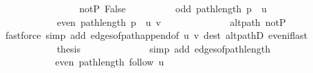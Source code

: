 \begin{isabellebody}
\ \ \ \ \ \ \isamarkupfalse%
\isanewline
\ \ \ \ \ \ \ \ \isamarkupfalse%
\ not{\isacharunderscore}{\kern0pt}P{\isacharprime}{\kern0pt}{\isacharprime}{\kern0pt}{\isacharcolon}{\kern0pt}\ False\isanewline
\ \ \ \ \ \ \ \ \isamarkupfalse%
\ {\isachardoublequoteopen}odd\ {\isacharparenleft}{\kern0pt}path{\isacharunderscore}{\kern0pt}length\ {\isacharparenleft}{\kern0pt}p\ {\isacharat}{\kern0pt}\ {\isacharbrackleft}{\kern0pt}u{\isacharbrackright}{\kern0pt}{\isacharparenright}{\kern0pt}{\isacharparenright}{\kern0pt}{\isachardoublequoteclose}\isanewline
\ \ \ \ \ \ \ \ \isamarkupfalse%
\ {\isacharminus}{\kern0pt}\isanewline
\ \ \ \ \ \ \ \ \ \ \isamarkupfalse%
\ {\isachardoublequoteopen}even\ {\isacharparenleft}{\kern0pt}path{\isacharunderscore}{\kern0pt}length\ {\isacharparenleft}{\kern0pt}p\ {\isacharat}{\kern0pt}\ {\isacharbrackleft}{\kern0pt}u{\isacharcomma}{\kern0pt}\ v{\isacharbrackright}{\kern0pt}{\isacharparenright}{\kern0pt}{\isacharparenright}{\kern0pt}{\isachardoublequoteclose}\isanewline
\ \ \ \ \ \ \ \ \ \ \ \ \isamarkupfalse%
\ alt{\isacharunderscore}{\kern0pt}path\ not{\isacharunderscore}{\kern0pt}P{\isacharprime}{\kern0pt}{\isacharprime}{\kern0pt}\isanewline
\ \ \ \ \ \ \ \ \ \ \ \ \isamarkupfalse%
\ {\isacharparenleft}{\kern0pt}fastforce\ simp\ add{\isacharcolon}{\kern0pt}\ edges{\isacharunderscore}{\kern0pt}of{\isacharunderscore}{\kern0pt}path{\isacharunderscore}{\kern0pt}append{\isacharunderscore}{\kern0pt}{}{\isacharbrackleft}{\kern0pt}of\ {\isachardoublequoteopen}{\isacharbrackleft}{\kern0pt}u{\isacharcomma}{\kern0pt}\ v{\isacharbrackright}{\kern0pt}{\isachardoublequoteclose}{\isacharbrackright}{\kern0pt}\ dest{\isacharcolon}{\kern0pt}\ alt{\isacharunderscore}{\kern0pt}pathD{\isacharparenleft}{\kern0pt}{}{\isacharparenright}{\kern0pt}\ even{\isacharunderscore}{\kern0pt}if{\isacharunderscore}{\kern0pt}last{\isacharparenright}{\kern0pt}\isanewline
\ \ \ \ \ \ \ \ \ \ \isamarkupfalse%
\ {\isacharquery}{\kern0pt}thesis\isanewline
\ \ \ \ \ \ \ \ \ \ \ \ \isamarkupfalse%
\ {\isacharparenleft}{\kern0pt}simp\ add{\isacharcolon}{\kern0pt}\ edges{\isacharunderscore}{\kern0pt}of{\isacharunderscore}{\kern0pt}path{\isacharunderscore}{\kern0pt}length{\isacharparenright}{\kern0pt}\isanewline
\ \ \ \ \ \ \ \ \isamarkupfalse%
\isanewline
\ \ \ \ \ \ \ \ \isamarkupfalse%
\ \isamarkupfalse%
\ {\isachardoublequoteopen}even\ {\isacharparenleft}{\kern0pt}path{\isacharunderscore}{\kern0pt}length\ {\isacharparenleft}{\kern0pt}follow\ u{\isacharparenright}{\kern0pt}{\isacharparenright}{\kern0pt}{\isachardoublequoteclose}\isanewline

\end{isabellebody}
